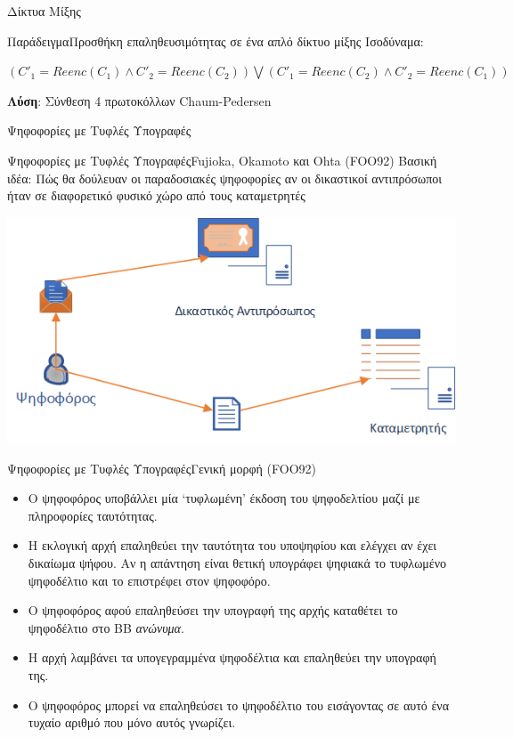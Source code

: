 \documentclass[handout]{beamer}
\begin{document}
\begin{section}{Δίκτυα Μίξης}
\begin{frame}[allowframebreaks]{Παράδειγμα}{Προσθήκη επαληθευσιμότητας σε ένα απλό δίκτυο μίξης}
Ισοδύναμα:
\begin{center}
$(C'_1 = Reenc(C_1) \wedge C'_2 = Reenc(C_2)) \bigvee (C'_1 = Reenc(C_2) \wedge C'_2 = Reenc(C_1))$
\end{center}

 
\textbf{Λύση}: Σύνθεση 4 πρωτοκόλλων Chaum-Pedersen
 
\end{frame}
\end{section} 

\begin{section}{Ψηφοφορίες με Τυφλές Υπογραφές}

\begin{frame}{Ψηφοφορίες με Τυφλές Υπογραφές}{Fujioka, Okamoto και Ohta (FOO92)}
    Βασική ιδέα: Πώς θα δούλευαν οι παραδοσιακές ψηφοφορίες αν οι δικαστικοί αντιπρόσωποι ήταν σε διαφορετικό φυσικό χώρο από τους καταμετρητές
    \begin{center}
        \includegraphics[scale=0.8]{simplefoo.PNG}
    \end{center}
\end{frame}

\begin{frame}{Ψηφοφορίες με Τυφλές Υπογραφές}{Γενική μορφή (FOO92)}
\begin{itemize}
\item Ο ψηφοφόρος υποβάλλει μία `τυφλωμένη' έκδοση του ψηφοδελτίου μαζί με πληροφορίες ταυτότητας.  \pause 
\item Η εκλογική αρχή επαληθεύει την ταυτότητα του υποψηφίου και ελέγχει αν έχει δικαίωμα ψήφου. Αν η απάντηση είναι θετική υπογράφει ψηφιακά το τυφλωμένο ψηφοδέλτιο και το επιστρέφει στον ψηφοφόρο. \pause 
\item Ο ψηφοφόρος αφού επαληθεύσει την υπογραφή της αρχής καταθέτει το ψηφοδέλτιο στο BB \textit{ανώνυμα}.  \pause 
\item Η αρχή λαμβάνει τα υπογεγραμμένα ψηφοδέλτια και επαληθεύει την υπογραφή της. \pause 
\item O ψηφοφόρος μπορεί να επαληθεύσει το ψηφοδέλτιο του εισάγοντας σε αυτό ένα τυχαίο αριθμό που μόνο αυτός γνωρίζει. 
\end{itemize}
\end{frame} 


\end{section}
\end{document}
